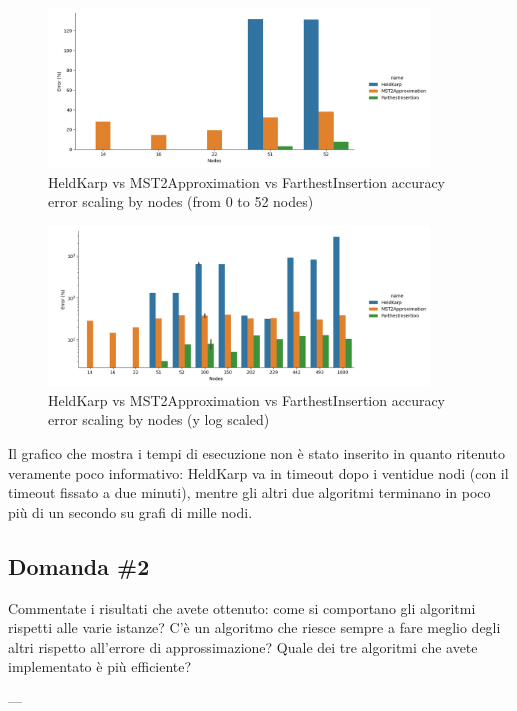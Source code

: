 \begin{figure}[H]
    \centering

    \includegraphics[width=0.9\textwidth]{./images/HeldKarp_vs_MST2Approximation_vs_FarthestInsertion__approximation_error__limited_to_52_nodes_.png}

    \caption{HeldKarp vs MST2Approximation vs FarthestInsertion accuracy error scaling by nodes (from 0 to 52 nodes)}
    \label{fig:heldkarp-mst2approx-farthestinsertion-accuracy-error-52-nodes}
\end{figure}

\begin{figure}[H]
    \centering

    \includegraphics[width=0.9\textwidth]{./images/HeldKarp_vs_MST2Approximation_vs_FarthestInsertion__approximation_error__y_log_scaled_.png}

    \caption{HeldKarp vs MST2Approximation vs FarthestInsertion accuracy error scaling by nodes (y log scaled)}
    \label{fig:heldkarp-mst2approx-farthestinsertion-accuracy-error}
\end{figure}

Il grafico che mostra i tempi di esecuzione non è stato inserito
in quanto ritenuto veramente poco informativo: HeldKarp va in
timeout dopo i ventidue nodi (con il timeout fissato a due minuti),
mentre gli altri due algoritmi terminano in poco più di un secondo
su grafi di mille nodi.

\subsection{Domanda \#2}

\begin{displayquote}
Commentate i risultati che avete ottenuto: come si comportano gli
algoritmi rispetti alle varie istanze? C'è un algoritmo che riesce
sempre a fare meglio degli altri rispetto all'errore di
approssimazione? Quale dei tre algoritmi che avete implementato è
più efficiente?
\end{displayquote}


\noindent ---\\
